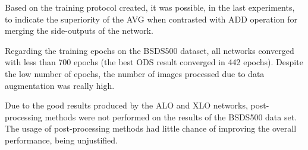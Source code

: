Based on the training protocol created, it was possible, in the last experiments, to indicate the superiority of the AVG when contrasted with ADD operation for merging the side-outputs of the network.


Regarding the training epochs on the BSDS500 dataset, all networks converged with less than 700 epochs (the best ODS result converged in 442 epochs).
Despite the low number of epochs, the number of images processed due to data augmentation was really high.

Due to the good results produced by the ALO and XLO networks, post-processing methods were not performed on the results of the BSDS500 data set.
The usage of post-processing methods had little chance of improving the overall performance, being unjustified.


